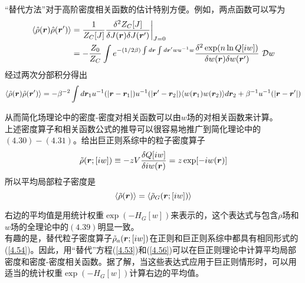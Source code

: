 “替代方法”对于高阶密度相关函数的估计特别方便。例如，两点函数可以写为\\
\begin{equation}
\begin{aligned}
\langle  \hat{ \rho } (\bm{r}) \hat{ \rho } (\bm{r}') \rangle &= \frac{1}{Z_{C}[J]} \frac{\delta ^{2}Z_{C}[J]}{\delta J(\bm{r}) \delta J(\bm{r}')} \bigg|_{J=0} \\&= -\frac{Z_0}{Z_{C}} \int  e^{-(1/2 \beta ) \int d\bm{r} \int d\bm{r}' w u^{-1} w } \frac{ \delta ^{2} \exp (n \ln Q[i w ])}{\delta w (\bm{r}) \delta w (\bm{r}')} ~\mathcal{D} w
\end{aligned}
\label{4.55}
\end{equation}
经过两次分部积分得出\\
\begin{equation}
\langle  \hat{ \rho } (\bm{r}) \hat{ \rho } (\bm{r}') \rangle = - \beta ^{-2} \int d\bm{r}_{1}  u^{-1}(|\bm{r}-\bm{r}_{1}|) u^{-1}(|\bm{r}'-\bm{r}_{2}|) \langle w(\bm{r}_1) w(\bm{r}_2)\rangle d\bm{r}_{2} + \beta ^{-1} u^{-1} (|\bm{r}-\bm{r}'|)
\label{4.56}
\end{equation}

从而简化场理论中的密度-密度对相关函数可以由$w$场的对相关函数来计算。\\

上述密度算子和相关函数公式的推导可以很容易地推广到简化理论中的$(4.30)-(4.31)$。给出巨正则系综中的粒子密度算子\\
\begin{equation}
\tilde{ \rho }(\bm{r};[i w ]) \equiv -z V \frac{ \delta Q[i w]}{\delta i w (\bm{r})} = z \exp [-i w (\bm{r})]
\end{equation}
所以平均局部粒子密度是\\
\begin{equation}
\langle \tilde{ \rho } (\bm{r}) \rangle = \langle \tilde{ \rho }_{G}(\bm{r};[i w ]) \rangle
\end{equation}

右边的平均值是用统计权重$\exp ( -H_{G}[ w])$来表示的，这个表达式与包含$ \rho $场和$ w $场的全理论中的$(4.39)$明显一致。\\

有趣的是，替代粒子密度算子$ \tilde{ \rho }_{a}(\bm{r};[i w])$在正则和巨正则系综中都具有相同形式的(\ref{4.54})。因此，用“替代”方程(\ref{4.53})和(\ref{4.56})可以在巨正则理论中计算平均局部密度和密度-密度相关函数。据了解，当这些表达式应用于巨正则情形时，可以用适当的统计权重$\exp (-H_{G}[ w ])$计算右边的平均值。\\

